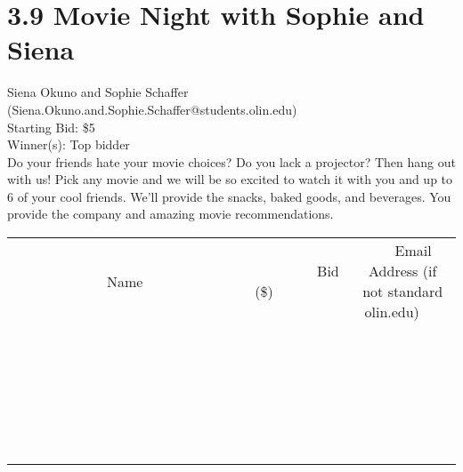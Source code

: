 \documentclass[11pt]{article}
\begin{document}
\section*{3.9 Movie Night with Sophie and Siena}
Siena Okuno and Sophie Schaffer (Siena.Okuno.and.Sophie.Schaffer@students.olin.edu) \\
Starting Bid: \$5 \\
Winner(s): 
Top bidder \\
Do your friends hate your movie choices? Do you lack a projector? Then hang out with us! Pick any movie and we will be so excited to watch it with you and up to 6 of your cool friends. We'll provide the snacks, baked goods, and beverages. You provide the company and amazing movie recommendations. \\[6ex]
\begin{tabular}{c c c}
~~~~~~~~~~~~~Name~~~~~~~~~~~~~ & ~~~~~~~~~Bid (\$)~~~~~~~~~ & ~~~Email Address (if not standard olin.edu)~~~ \\
 & & \\
\hline
 & & \\
\hline
 & & \\
\hline
 & & \\
\hline
 & & \\
\hline
 & & \\
\hline
 & & \\
\hline
 & & \\
\hline
 & & \\
\hline
 & & \\
\hline
 & & \\
\hline
 & & \\
\hline
 & & \\
\hline
 & & \\
\hline
 & & \\
\hline
 & & \\
\hline
 & & \\
\hline
 & & \\
\hline
 & & \\
\hline
 & & \\
\hline
 & & \\
\hline
 & & \\
\hline
 & & \\
\hline
 & & \\
\hline
 & & \\
\hline
 & & \\
\hline
\end{tabular}
\clearpage
\end{document}
